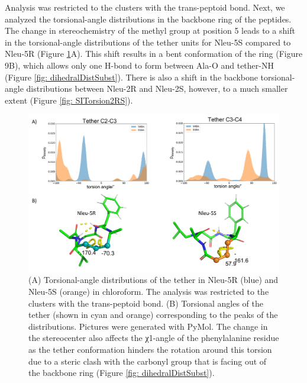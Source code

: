 Analysis was restricted to the clusters with the trans-peptoid bond.
Next, we analyzed the torsional-angle distributions in the backbone ring of the peptides. The change in stereochemistry of the methyl group at position 5 leads to a shift in the torsional-angle distributions of the tether units for Nleu-5S compared to Nleu-5R (Figure \ref{fig: dihedralDist}A). This shift results in a bent conformation of the ring (Figure 9B), which allows only one H-bond to form between Ala-O and tether-NH (Figure \ref{fig: dihedralDistSubst}). There is also a shift in the backbone torsional-angle distributions between Nleu-2R and Nleu-2S, however, to a much smaller extent (Figure \ref{fig: SITorsion2RS}).

\begin{figure}[h!]
    \centering
    \includegraphics[width=\textwidth]{7_chapter_5/fig/results/dihedral_dist.png}
    \caption{(A) Torsional-angle distributions of the tether in Nleu-5R (blue) and Nleu-5S (orange) in chloroform. The analysis was restricted to the clusters with the trans-peptoid bond. (B) Torsional angles of the tether (shown in cyan and orange) corresponding to the peaks of the distributions. Pictures were generated with PyMol. \cite{Delano2020} The change in the stereocenter also affects the χ1-angle of the phenylalanine residue as the tether conformation hinders the rotation around this torsion due to a steric clash with the carbonyl group that is facing out of the backbone ring (Figure \ref{fig: dihedralDistSubst}).
    }
    \label{fig: dihedralDist}
\end{figure}

